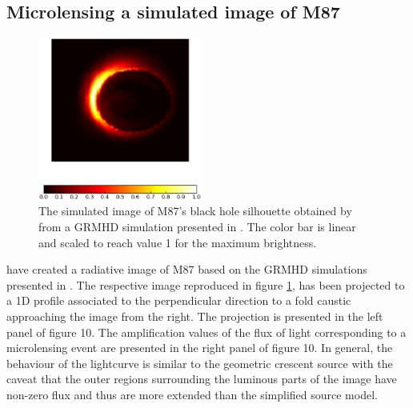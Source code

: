 \documentclass[usenatbib]{mn2e}
\begin{document}
\subsection{Microlensing a simulated image of M87}

\begin{figure}
\centering
        \includegraphics[width = 0.48\textwidth]{figures/M87_image.eps}
\caption{\label{fig:M87_image} The simulated image of M87's black hole
  silhouette obtained by \citep{2012MNRAS.421.1517D} from a GRMHD
  simulation presented in \citep{2009MNRAS.394L.126M}. The color bar
  is linear and scaled to reach value 1 for the maximum
  brightness.}
\end{figure}

\cite{2012MNRAS.421.1517D} have created a radiative image of M87 based on the GRMHD simulations presented in \citep{2009MNRAS.394L.126M}. The respective image reproduced in figure \ref{fig:M87_image}, has been projected to a 1D profile associated to the perpendicular direction to a fold caustic approaching the image from the right. The projection is presented in the left panel of figure 10. The amplification values of the flux of light corresponding to a microlensing event are presented in the right panel of figure 10. In general, the behaviour of the lightcurve is similar to the geometric crescent source with the caveat that the outer regions surrounding the luminous parts of the image have non-zero flux and thus are more extended than the simplified source model.
\end{document}
